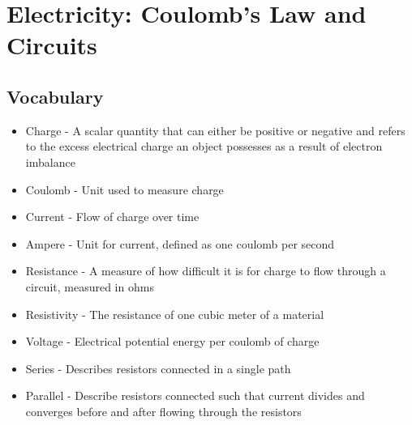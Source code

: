 \section{Electricity: Coulomb's Law and Circuits}

\subsection{Vocabulary}
\begin{itemize}
    \item Charge - A scalar quantity that can either be positive or negative and refers to the excess electrical charge an object possesses as a result of electron imbalance
    \item Coulomb - Unit used to measure charge
    \item Current - Flow of charge over time
    \item Ampere - Unit for current, defined as one coulomb per second
    \item Resistance - A measure of how difficult it is for charge to flow through a circuit, measured in ohms
    \item Resistivity - The resistance of one cubic meter of a material
    \item Voltage - Electrical potential energy per coulomb of charge
    \item Series - Describes resistors connected in a single path
    \item Parallel - Describe resistors connected such that current divides and converges before and after flowing through the resistors
\end{itemize}


